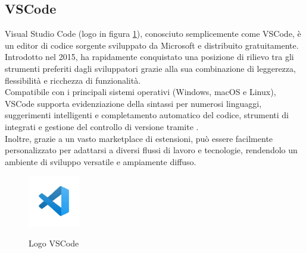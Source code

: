 \subsection{VSCode}
\label{subsec:vscode}
\noindent Visual Studio Code (logo in figura \ref{fig:logo_vscode}), conosciuto semplicemente come VSCode, è un editor di codice sorgente sviluppato da Microsoft e distribuito gratuitamente. Introdotto nel 2015, ha rapidamente conquistato una posizione di rilievo tra gli strumenti preferiti dagli sviluppatori grazie alla sua combinazione di leggerezza, flessibilità e ricchezza di funzionalità. \\Compatibile con i principali sistemi operativi (Windows, macOS e Linux), VSCode supporta evidenziazione della sintassi per numerosi linguaggi, suggerimenti intelligenti e completamento automatico del codice, strumenti di  integrati e gestione del controllo di versione tramite . \\Inoltre, grazie a un vasto marketplace di estensioni, può essere facilmente personalizzato per adattarsi a diversi flussi di lavoro e tecnologie, rendendolo un ambiente di sviluppo versatile e ampiamente diffuso.
\begin{figure}[H]
    \centering
    \includegraphics[width=0.2\textwidth, alt={Logo VSCode}]{img/vscode.jpg}
    \caption[Logo VSCode]{Logo VSCode}\label{fig:logo_vscode}
\end{figure}

